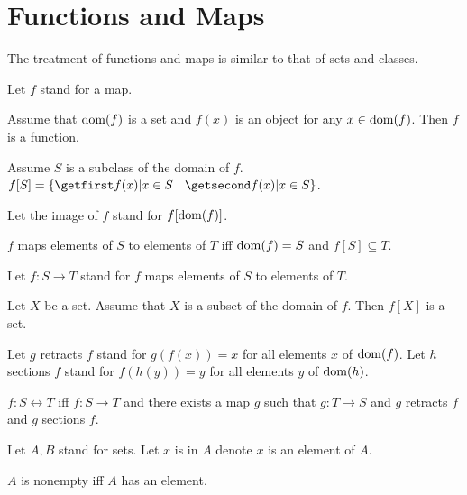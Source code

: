 \documentclass{article}
\begin{document}
\section{Functions and Maps}

The treatment of functions and maps is similar to that
of sets and classes.

\begin{forthel}
  Let $f$ stand for a map.

  \begin{axiom}
    Assume that $\operatorname{dom}(f)$ is a set and $f(x)$ is an object for any
    $x \in \operatorname{dom}(f)$.
    Then $f$ is a function.
  \end{axiom}

  \begin{definition}
    Assume $S$ is a subclass of the domain of $f$.
    $f[S] = \class{f(x) | x \in S}$.
  \end{definition}

  Let the image of $f$ stand for $f[\operatorname{dom}(f)]$.

  \begin{definition}
    $f$ maps elements of $S$ to elements of $T$ iff $\operatorname{dom}(f) = S$ and $f[S]
    \subseteq T$.
  \end{definition}

  Let $f : S \rightarrow T$ stand for $f$ maps elements of $S$ to elements of
  $T$.

  \begin{axiom}
    Let $X$ be a set.
    Assume that $X$ is a subset of the domain of $f$.
    Then $f[X]$ is a set.
  \end{axiom}

  Let $g$ retracts $f$ stand for $g(f(x)) = x$ for all elements $x$ of
  $\operatorname{dom}(f)$.
  Let $h$ sections $f$ stand for $f(h(y)) = y$ for all elements $y$ of
  $\operatorname{dom}(h)$.

  \begin{definition}
    $f : S \leftrightarrow T$ iff $f : S \rightarrow T$ and there exists a map
    $g$ such that $g : T \rightarrow S$ and $g$ retracts $f$ and $g$ sections
    $f$.
  \end{definition}

Let $A,B$ stand for sets.
Let $x$ is in $A$ denote $x$ is an element of $A$.

\begin{definition}[1 3]
$A$ is nonempty iff $A$ has an element.
\end{definition}

\end{forthel}
\end{document}
